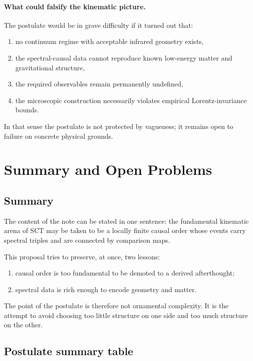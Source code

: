 \documentclass[12pt,a4paper]{article}
\theoremstyle{postulate}
\begin{document}
\paragraph{What could falsify the kinematic picture.}
The postulate would be in grave difficulty if it turned out that:
\begin{enumerate}[label=(\alph*)]
  \item no continuum regime with acceptable infrared geometry exists,
  \item the spectral-causal data cannot reproduce known low-energy matter and
  gravitational structure,
  \item the required observables remain permanently undefined,
  \item the microscopic construction necessarily violates empirical
  Lorentz-invariance bounds.
\end{enumerate}
In that sense the postulate is not protected by vagueness; it remains open to
failure on concrete physical grounds.

\section{Summary and Open Problems}
\label{sec:summary}

\subsection{Summary}

The content of the note can be stated in one sentence: the fundamental
kinematic arena of SCT may be taken to be a locally finite causal order whose
events carry spectral triples and are connected by comparison maps.

This proposal tries to preserve, at once, two lessons:
\begin{enumerate}[label=(\roman*)]
  \item causal order is too fundamental to be demoted to a derived afterthought;
  \item spectral data is rich enough to encode geometry and matter.
\end{enumerate}
The point of the postulate is therefore not ornamental complexity.  It is the
attempt to avoid choosing too little structure on one side and too much
structure on the other.

\subsection{Postulate summary table}
\end{document}
